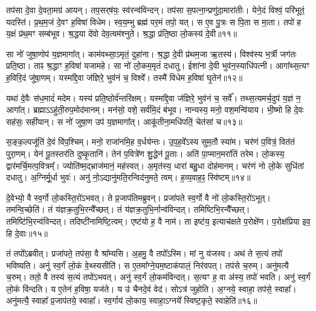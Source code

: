    तप॑सा दे॒वा दे॒वता॒मग्र॑ आयन्।
   तप॒सर्‌ष॑यः॒ स्व॑रन्व॑विन्दन्।
   तप॑सा स॒पत्ना॒न्प्रणु॑दा॒मारा॑तीः।
   येने॒दं विश्वं॒ परि॑भूतं॒ यदस्ति॑।
   प्र॒थ॒म॒जं दे॒वꣳ ह॒विषा॑ विधेम।
   स्व॒य॒म्भु ब्रह्म॑ पर॒मं तपो॒ यत्।
   स ए॒व पु॒त्रः स पि॒ता स मा॒ता।
   तपो॑ ह य॒क्षं प्र॑थ॒मꣳ सम्ब॑भूव।
   श्र॒द्धया दे॑वो देव॒त्वम॑श्नुते।
   श्र॒द्धा प्र॑ति॒ष्ठा लो॒कस्य॑ दे॒वी॥११॥

   सा नो॑ जुषा॒णोप॑ य॒ज्ञमागा᳚त्।
   काम॑वथ्सा॒ऽमृतं॒ दुहा॑ना।
   श्र॒द्धा दे॒वी प्र॑थम॒जा ऋ॒तस्य॑।
   विश्व॑स्य भ॒र्त्री जग॑तः प्रति॒ष्ठा।
   ताꣴ श्र॒द्धाꣳ ह॒विषा॑ यजामहे।
   सा नो॑ लो॒कम॒मृतं॑ दधातु।
   ईशा॑ना दे॒वी भुव॑न॒स्याधि॑पत्नी।
   आगा᳚थ्स॒त्यꣳ ह॒विरि॒दं जु॑षा॒णम्।
   यस्मा᳚द्दे॒वा ज॑ज्ञिरे॒ भुव॑नं च॒ विश्वे᳚।
   तस्मै॑ विधेम ह॒विषा॑ घृ॒तेन॑॥१२॥

   यथा॑ दे॒वैः स॑ध॒मादं॑ मदेम।
   यस्य॑ प्रति॒ष्ठोर्व॑न्तरि॑क्षम्।
   यस्मा᳚द्दे॒वा ज॑ज्ञिरे॒ भुव॑नं च॒ सर्वे᳚।
   तथ्स॒त्यमर्च॒दुप॑ य॒ज्ञं न॒ आगा᳚त्।
   ब्रह्माऽऽहु॑ती॒रुप॒मोद॑मानम्।
   मन॑सो॒ वशे॒ सर्व॑मि॒दं ब॑भूव।
   नान्यस्य॒ मनो॒ वश॒मन्वि॑याय।
   भी॒ष्मो हि दे॒वः सह॑सः॒ सही॑यान्।
   स नो॑ जुषा॒ण उप॑ य॒ज्ञमागा᳚त्।
   आकू॑तीना॒मधि॑पतिं॒ चेत॑सां च॥१३॥

   स॒ङ्क॒ल्पजू॑तिं दे॒वं वि॑प॒श्चिम्।
   मनो॒ राजा॑नमि॒ह व॒र्धय॑न्तः।
   उ॒प॒ह॒वे᳚ऽस्य सुम॒तौ स्या॑म।
   चर॑णं प॒वित्रं॒ वित॑तं पुरा॒णम्।
   येन॑ पू॒तस्तर॑ति दुष्कृ॒तानि॑।
   तेन॑ प॒वित्रे॑ण शु॒द्धेन॑ पू॒ताः।
   अति॑ पा॒प्मान॒मरा॑तिं तरेम।
   लो॒कस्य॒ द्वार॑मर्चि॒मत्प॒वित्रम्᳚।
   ज्योति॑ष्म॒द्भ्राज॑मानं॒ मह॑स्वत्।
   अ॒मृत॑स्य॒ धारा॑ बहु॒धा दोह॑मानम्।
   चर॑णं नो लो॒के सुधि॑तां दधातु।
   अ॒ग्निर्मू॒र्धा भुवः॑।
   अनु॑ नो॒ऽद्यानु॑मति॒रन्विद॑नुमते॒ त्वम्।
   ह॒व्य॒वाह॒ꣴ॒ स्वि॑ष्टम्॥१४॥\anuvakamend
  
   दे॒वेभ्यो॒ वै स्व॒र्गो लो॒कस्ति॒रो॑ऽभवत्।
   ते प्र॒जाप॑तिमब्रुवन्।
   प्रजा॑पते स्व॒र्गो वै नो॑ लो॒कस्ति॒रो॑ऽभूत्।
   तमन्वि॒च्छेति॑।
   तं य॑ज्ञक्र॒तुभि॒रन्वै᳚च्छत्।
   तं य॑ज्ञक्र॒तुभि॒र्नान्व॑विन्दत्।
   तमिष्टिभि॒\-रन्वै᳚च्छत्।
   तमिष्टि॑भि॒रन्व॑विन्दत्।
   तदिष्टी॑नामिष्टि॒त्वम्।
   एष्ट॑यो ह॒ वै नाम॑।
   ता इष्ट॑य॒ इत्याच॑क्षते प॒रोक्षे॑ण।
   प॒रोक्ष॑प्रिया इव॒ हि दे॒वाः॥१५॥

   तं तपो᳚ऽब्रवीत्।
   प्रजा॑पते॒ तप॑सा॒ वै श्रा᳚म्यसि।
   अ॒हमु॒ वै तपो᳚ऽस्मि।
   मां नु य॑जस्व।
   अथ॑ ते स॒त्यं तपो॑ भविष्यति।
   अनु॑ स्व॒र्गं लो॒कं वे॒थ्स्यसीति॑।
   स ए॒तमा᳚ग्ने॒यम॒ष्टाक॑पालं॒ निर॑वपत्।
   तप॑से च॒रुम्।
   अनु॑मत्यै च॒रुम्।
   ततो॒ वै तस्य॑ स॒त्यं तपो॑ऽभवत्।
   अनु॑ स्व॒र्गं लो॒कम॑विन्दत्।
   स॒त्यꣳ ह॒ वा अ॑स्य॒ तपो॑ भवति।
   अनु॑ स्व॒र्गं लो॒कं वि॑न्दति।
   य ए॒तेन॑ ह॒विषा॒ यज॑ते।
   य उ॑ चैनदे॒वं वेद॑।
   सोऽत्र॑ जुहोति।
   अ॒ग्नये॒ स्वाहा॒ तप॑से॒ स्वाहा᳚।
   अनु॑मत्यै॒ स्वाहा᳚ प्र॒जाप॑तये॒ स्वाहा᳚।
   स्व॒र्गाय॑ लो॒काय॒ स्वाहा॒ऽग्नये᳚ स्विष्ट॒कृते॒ स्वाहेति॑॥१६॥


